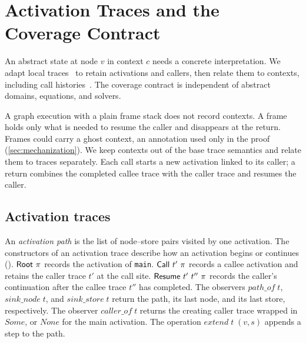 \section{Activation Traces and the Coverage Contract}
\label{sec:traces}

An abstract state at node $v$ in context $c$ needs a concrete interpretation.
We adapt local traces~\cite{schwarz21} to retain activations and callers, then
relate them to contexts, including call histories~\cite{sharir81}. The
coverage contract is independent of abstract domains, equations, and solvers.

A graph execution with a
plain frame stack does not record contexts. A frame holds only what is
needed to resume the caller and disappears at the return. Frames could carry a
ghost context, an annotation used only in the proof
(\cref{sec:mechanization}). We keep contexts out of the base trace semantics
and relate them to traces separately. Each call starts a new activation linked
to its caller; a return combines the completed callee trace with the caller
trace and resumes the caller.

\subsection{Activation traces}

An \emph{activation path} is the list of node--store pairs visited by one
activation. The constructors of an activation trace describe how an activation begins
or continues (). $\textsf{Root}~\pi$ records
the activation of \texttt{main}. $\textsf{Call}~t'~\pi$ records a callee
activation and retains the caller trace $t'$ at the call site.
$\textsf{Resume}~t'~t''~\pi$ records the caller's continuation after the callee
trace $t''$ has completed. The observers $\mathit{path\_of}\;t$,
$\mathit{sink\_node}\;t$, and $\mathit{sink\_store}\;t$ return the path, its last
node, and its last store, respectively. The observer $\mathit{caller\_of}\;t$
returns the creating caller trace wrapped in $\mathit{Some}$, or
$\mathit{None}$ for the main activation. The operation
$\mathit{extend}\;t\;(v, s)$ appends a step to the path.

